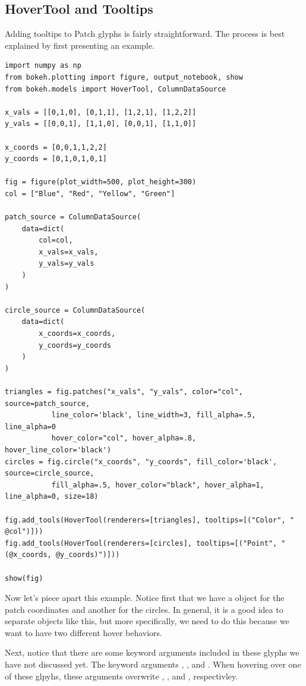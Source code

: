 \subsection*{HoverTool and Tooltips}
Adding tooltips to Patch glyphs is fairly straightforward. The process is best
explained by first presenting an example.

\begin{lstlisting}
import numpy as np
from bokeh.plotting import figure, output_notebook, show
from bokeh.models import HoverTool, ColumnDataSource

x_vals = [[0,1,0], [0,1,1], [1,2,1], [1,2,2]]
y_vals = [[0,0,1], [1,1,0], [0,0,1], [1,1,0]]

x_coords = [0,0,1,1,2,2]
y_coords = [0,1,0,1,0,1]

fig = figure(plot_width=500, plot_height=300)
col = ["Blue", "Red", "Yellow", "Green"]

patch_source = ColumnDataSource(
    data=dict(
        col=col,
        x_vals=x_vals,
        y_vals=y_vals
    )
)

circle_source = ColumnDataSource(
    data=dict(
        x_coords=x_coords,
        y_coords=y_coords
    )
)

triangles = fig.patches("x_vals", "y_vals", color="col", source=patch_source,
           line_color='black', line_width=3, fill_alpha=.5, line_alpha=0
           hover_color="col", hover_alpha=.8, hover_line_color='black')
circles = fig.circle("x_coords", "y_coords", fill_color='black', source=circle_source,
           fill_alpha=.5, hover_color="black", hover_alpha=1, line_alpha=0, size=18)

fig.add_tools(HoverTool(renderers=[triangles], tooltips=[("Color", " @col")]))
fig.add_tools(HoverTool(renderers=[circles], tooltips=[("Point", " (@x_coords, @y_coords)")]))

show(fig)
\end{lstlisting}

Now let's piece apart this example. Notice first that we have a
 object for the patch coordinates and another
 for the circles. In general, it is a good idea to separate
 objects like this, but more specifically, we need to do this
because we want to have two different hover behaviors.

Next, notice that there are some keyword arguments included in these glyphs we
have not discussed yet. The keyword arguments , ,
and . When hovering over one of these glpyhs, these arguments
overwrite , , and , respectivley.

